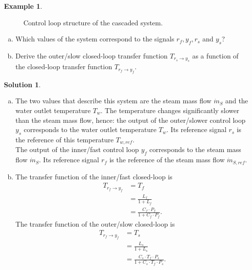 \documentclass[a4paper,12 pt]{article}
\numberwithin{equation}{section}
\theoremstyle{definition}
\newtheorem{bsp}{Example}
\theoremstyle{remark}
\theoremstyle{definition}
\newtheorem*{lsg}{Solution}
\theoremstyle{definition}
\theoremstyle{definition}
\theoremstyle{remark}
\begin{document}
\begin{bsp}
\begin{figure}[h]
\begin{center}
\caption{Control loop structure of the cascaded system.}
\label{fig:wtblock}
\end{center}
\end{figure}
\begin{enumerate}[(a)]
\item Which values of the system correspond to the signals $r_f,y_f,r_s$ and $y_s$?
\item Derive the outer/slow closed-loop transfer function $T_{r_s\rightarrow y_s}$ as a function of the closed-loop transfer function $T_{r_f\rightarrow y_f}$.
\end{enumerate}
\newpage
\begin{lsg}
\
\begin{enumerate}[(a)]
\item The two values that describe this system are the steam mass flow $\dot{m}_S$ and the water outlet temperature $T_w$. The temperature changes significantly slower than the steam mass flow, hence: the output of the outer/slower control loop $y_s$ corresponds to the water outlet temperature $T_w$. Its reference signal $r_s$ is the reference of this temperature $T_{w,ref}$. \\
The output of the inner/fast control loop $y_f$ corresponds to the steam mass flow $\dot{m}_S$. Its reference signal $r_f$ is the reference of the steam mass flow $\dot{m}_{S,ref}$.
\item The transfer function of the inner/fast closed-loop is
\begin{equation*}
\begin{split}
T_{r_f\rightarrow y_f}&=T_f\\
&=\frac{L_f}{1+L_f}\\
&=\frac{C_f\cdot P_f}{1+C_f\cdot P_f}.
\end{split}
\end{equation*}
The transfer function of the outer/slow closed-loop is
\begin{equation*}
\begin{split}
T_{r_f\rightarrow y_f}&=T_s\\
&=\frac{L_s}{1+L_s}\\
&=\frac{C_s\cdot T_f\cdot P_s}{1+C_s\cdot T_f\cdot P_s}.
\end{split}
\end{equation*}

\end{enumerate}

\end{lsg}


\end{bsp}
\end{document}
